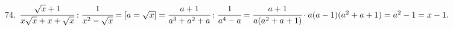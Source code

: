 74. $\cfrac{\sqrt{x}+1}{x\sqrt{x}+x+\sqrt{x}}:\cfrac{1}{x^2-\sqrt{x}}=[a=\sqrt{x}]=
\cfrac{a+1}{a^3+a^2+a}:\cfrac{1}{a^4-a}=\cfrac{a+1}{a(a^2+a+1)}\cdot a(a-1)(a^2+a+1)=a^2-1=x-1.$\\
